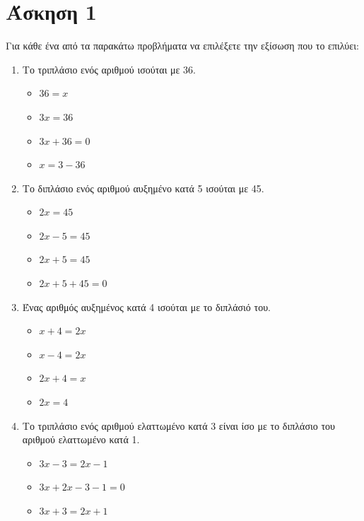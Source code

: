 \documentclass[a4paper,10pt]{report}
\begin{document}
\section*{Άσκηση 1  \hfill \small{}}
Για κάθε ένα από τα παρακάτω προβλήματα να επιλέξετε την εξίσωση που το επιλύει:
\begin{enumerate}[1)]
\item Το τριπλάσιο ενός αριθμού ισούται με 36. %
\begin{multicols}{4}
\begin{itemize}
 \item $36=x$
 \item $3x=36$
 \item $3x+36=0$
 \item $x=3-36$
\end{itemize}
\end{multicols}
\item Το διπλάσιο  ενός αριθμού αυξημένο κατά 5 ισούται με 45. %
\begin{multicols}{4}
\begin{itemize}
 \item $2x=45$
 \item $2x-5=45$
 \item $2x+5=45$
 \item $2x+5+45=0$
\end{itemize}
\end{multicols}
\item Ένας αριθμός αυξημένος κατά 4 ισούται με το διπλάσιό του. %
\begin{multicols}{4}
\begin{itemize}
 \item $x+4=2x$
 \item $x-4=2x$
 \item $2x+4=x$
 \item $2x=4$
\end{itemize}
\end{multicols}
\item Το τριπλάσιο ενός αριθμού ελαττωμένο κατά 3 είναι ίσο με το διπλάσιο του αριθμού ελαττωμένο κατά 1.%
\begin{multicols}{4}
\begin{itemize}
 \item $3x-3=2x-1$
 \item $3x+2x-3-1=0$
 \item $3x+3=2x+1$

\end{itemize}
\end{multicols}
\end{enumerate}
\end{document}
